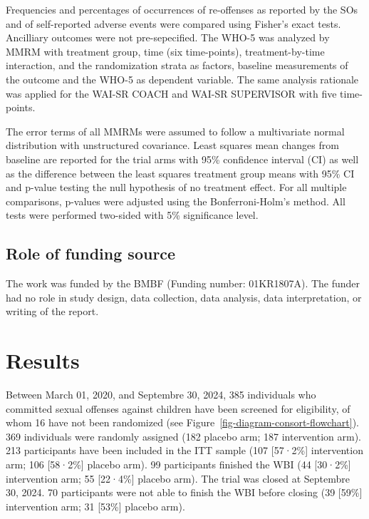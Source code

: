 \documentclass[
  super,
  preprint,
  1p,
  onecolumn]{elsarticle}
\begin{document}
Frequencies and percentages of occurrences of re-offenses as reported by
the SOs and of self-reported adverse events were compared using Fisher's
exact tests. Ancilliary outcomes were not pre-sepecified. The WHO-5 was
analyzed by MMRM with treatment group, time (six time-points),
treatment-by-time interaction, and the randomization strata as factors,
baseline measurements of the outcome and the WHO-5 as dependent
variable. The same analysis rationale was applied for the WAI-SR COACH
and WAI-SR SUPERVISOR with five time-points.

The error terms of all MMRMs were assumed to follow a multivariate
normal distribution with unstructured covariance. Least squares mean
changes from baseline are reported for the trial arms with 95\%
confidence interval (CI) as well as the difference between the least
squares treatment group means with 95\% CI and p-value testing the null
hypothesis of no treatment effect. For all multiple comparisons,
p-values were adjusted using the Bonferroni-Holm's method. All tests
were performed two-sided with 5\% significance level.

\subsection{Role of funding source}\label{role-of-funding-source}

The work was funded by the BMBF (Funding number: 01KR1807A). The funder
had no role in study design, data collection, data analysis, data
interpretation, or writing of the report.

\section{Results}\label{results}

Between March 01, 2020, and Septembre 30, 2024, 385 individuals who
committed sexual offenses against children have been screened for
eligibility, of whom 16 have not been randomized (see
Figure~\ref{fig-diagram-consort-flowchart}). 369 individuals were
randomly assigned (182 placebo arm; 187 intervention arm). 213
participants have been included in the ITT sample (107 {[}57·2\%{]}
intervention arm; 106 {[}58·2\%{]} placebo arm). 99 participants
finished the WBI (44 {[}30·2\%{]} intervention arm; 55 {[}22·4\%{]}
placebo arm). The trial was closed at Septembre 30, 2024. 70
participants were not able to finish the WBI before closing (39
{[}59\%{]} intervention arm; 31 {[}53\%{]} placebo arm).
\end{document}
